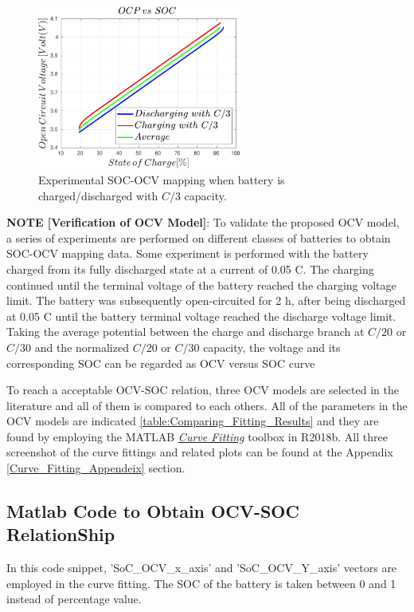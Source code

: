 \documentclass[12pt]{article}
\begin{document}
\begin{figure}[t!]
	\centering
	\includegraphics[width=0.6\textwidth, keepaspectratio]{images/OCV_vs_SOC.pdf}
	\caption{Experimental SOC-OCV mapping when battery is charged/discharged with $C/3$ capacity.}
	\label{fig:OCV_vs_SOC}
\end{figure}

\par \noindent \textbf{NOTE [Verification of OCV Model]}: To validate the proposed OCV model, a series of experiments are performed on different classes of batteries to obtain SOC-OCV mapping data. Some experiment is performed with the battery charged from its fully discharged state at a current of 0.05 C. The charging continued until the terminal voltage of the battery reached the charging voltage limit. The battery was subsequently open-circuited for 2 h, after being discharged at 0.05 C until the battery terminal voltage reached the discharge voltage limit.
Taking the average potential between the charge and discharge branch at $C/20$ or $C/30$  and the normalized $C/20$ or $C/30$ capacity, the voltage and its corresponding SOC can be regarded as OCV versus SOC curve \cite{Dubarry2007}\newline 

\par \noindent To reach a acceptable OCV-SOC relation, three OCV models are selected in the literature and all of them is compared to each others. All of the parameters in the OCV models are indicated \ref{table:Comparing_Fitting_Results} and they are found by employing the MATLAB \href{https://www.mathworks.com/products/curvefitting.html}{\textit{Curve Fitting}} toolbox in R2018b. All three screenshot of the curve fittings and related plots can be found at the Appendix \ref{Curve_Fitting_Appendeix} section.

\subsection{Matlab Code to Obtain OCV-SOC RelationShip}
In this code snippet, 'SoC\_OCV\_x\_axis' and 'SoC\_OCV\_Y\_axis' vectors are employed in the curve fitting. The SOC of the battery is taken between 0 and 1 instead of percentage value.  
 
\end{document}
